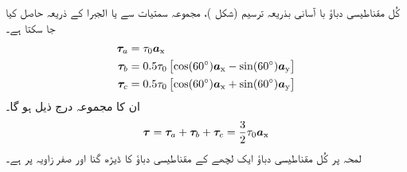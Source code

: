 کُل مقناطیسی دباؤ با آسانی بذریعہ ترسیم (شکل )،  مجموعہ سمتیات سے   یا  الجبرا کے ذریعہ حاصل کیا جا سکتا ہے۔
\begin{gather}
\begin{aligned}
{\ensuremath{{\boldsymbol{\tau}}}}_a&=\tau_0 {\boldsymbol{a}}_{\textup{x}}\\
{{\boldsymbol{\tau}}}_b&=0.5 \tau_0 \left[\cos (60^{\circ}) {\boldsymbol{a}}_{\textup{x}}-\sin (60^{\circ}){\boldsymbol{a}}_{\textup{y}} \right]\\
{{\boldsymbol{\tau}}}_c&=0.5 \tau_0 \left[\cos (60^{\circ}) {\boldsymbol{a}}_{\textup{x}}+\sin (60^{\circ}){\boldsymbol{a}}_{\textup{y}} \right]
\end{aligned}
\end{gather}
ان کا مجموعہ درج ذیل ہو گا۔
\begin{align}
{\ensuremath{{\boldsymbol{\tau}}}}={{\boldsymbol{\tau}}}_a+{{\boldsymbol{\tau}}}_b+{{\boldsymbol{\tau}}}_c=\frac{3}{2} \tau_0 {\boldsymbol{a}}_{\textup{x}}
\end{align}
لمحہ  پر کُل مقناطیسی دباؤ ایک لچھے کے مقناطیسی دباؤ کا ڈیڑھ گنا  اور  صفر زاویہ پر ہے۔

